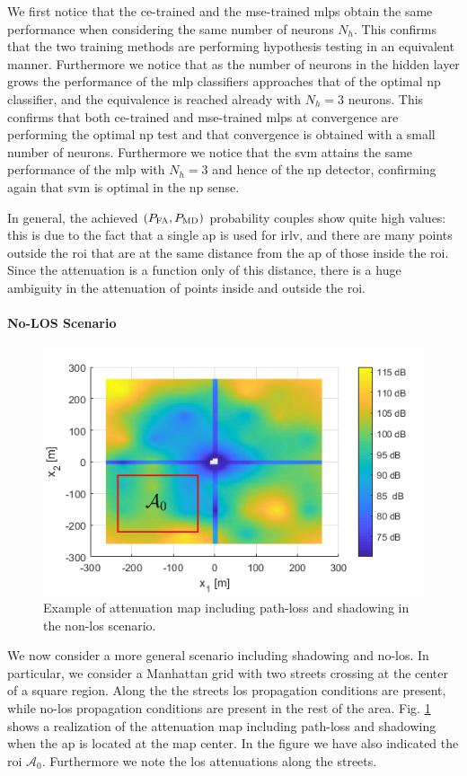\documentclass[draftcls,onecolumn,12pt]{IEEEtran}
\begin{document}
We first notice that the \ac{ce}-trained and the \ac{mse}-trained \acp{mlp} obtain the same performance when considering the same number of neurons $N_h$. This confirms that the two training methods are performing hypothesis testing in an equivalent manner. Furthermore we notice that as the number of neurons in the hidden layer grows the performance of the \ac{mlp} classifiers approaches that of the optimal \ac{np} classifier, and the equivalence is reached already with $N_h=3$ neurons. This confirms that both \ac{ce}-trained and \ac{mse}-trained \acp{mlp} at convergence are performing the optimal \ac{np} test and that convergence is obtained with a small number of neurons. Furthermore we notice that the \ac{svm} attains the same performance of the \ac{mlp} with $N_h = 3$ and hence of the \ac{np} detector, confirming again that \ac{svm} is optimal in the \ac{np} sense.

In general, the achieved $(P_{\rm FA}, P_{\rm MD})$ probability couples show quite high values: this is due to the fact that a single \ac{ap} is used for \ac{irlv}, and there are many points outside the \ac{roi} that are at the same distance from the \ac{ap} of those inside the \ac{roi}. Since the attenuation is a function only of this distance, there is a huge ambiguity in the attenuation of points inside and outside the \ac{roi}.

\paragraph*{No-LOS Scenario} 

\begin{figure}[t]
    \centering
    \includegraphics[width=0.6\columnwidth]{surfColorato.png}
    \caption{Example of attenuation map including path-loss and shadowing in the non-\ac{los} scenario.}
    \label{fig:map}
\end{figure}

We now consider a more general scenario including shadowing and no-\ac{los}. In particular, we consider a Manhattan grid with two streets crossing at the center of a square region. Along the the streets \ac{los} propagation conditions are present, while no-\ac{los} propagation conditions are present in the rest of the area. Fig. \ref{fig:map} shows a realization of the  attenuation map including path-loss and shadowing when the \ac{ap} is located at the map center. In the figure we have also indicated the \ac{roi} $\mathcal{A}_0$. Furthermore we note the \ac{los} attenuations along the streets.
\end{document}

